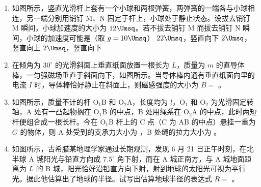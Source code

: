 \documentclass[\gkver]{gaokaozhenti}
\begin{document}
\begin{enumerate}
\item
如图所示，竖直光滑杆上套有一个小球和两根弹簧，两弹簧的一端各与小球相连，另一端分别用销钉 M、N 固定于杆上，小球处于静止状态。设拔去销钉 M 瞬间，小球加速度的大小为 $12\Umsq$。若不拔去销钉 M 而拔去销钉 N 瞬间，小球的加速度可能是（取 $g = 10\Umsq$）
\onepicture[h=3.34cm]{}
{$22\Umsq$，竖直向下}
{$2\Umsq$，竖直向上}
{$2\Umsq$，竖直向下}

\item
在倾角为 $30^{\circ}$ 的光滑斜面上垂直纸面放置一根长为 $L$，质量为 $m$ 的直导体棒，一匀强磁场垂直于斜面向下，如图所示。当导体棒内通有垂直纸面向里的电流 $I$ 时，导体棒恰好静止在斜面上，则磁感强度的大小为 $B =$ 。
\onepicture[align=right, w=3.65cm]{}

\item
如图所示，质量不计的杆 O$_{1}$B 和 O$_{2}$A，长度均为 $l$，O$_{1}$ 和 O$_{2}$ 为光滑固定转轴，A 处有一凸起物搁在 O$_{1}$B 的中点，B 处用绳系在 O$_{2}$A 的中点，此时两短杆便组合成一根长杆。今在 O$_{1}$B 杆上的 C 点（C 为 AB 的中点）悬挂一重为 $G$ 的物体，则 A 处受到的支承力大小为 ，B 处绳的拉力大小为 。
\onepicture[align=right, w=4.70cm]{}

\item
如图所示，古希腊某地理学家通过长期观测，发现 6 月 21 日正午时刻，在北半球 A 城阳光与铅直方向成 $7.5^{\circ}$ 角下射，而在 A 城正南方，与 A 城地面距离为 $L$ 的 B 城，阳光恰好沿铅直方向下射，射到地球的太阳光可视为平行光。据此他估算出了地球的半径。试写出估算地球半径的表达式 $R =$ 。
\onepicture[align=right, h=3.96cm]{}


\end{enumerate}
\end{document}
